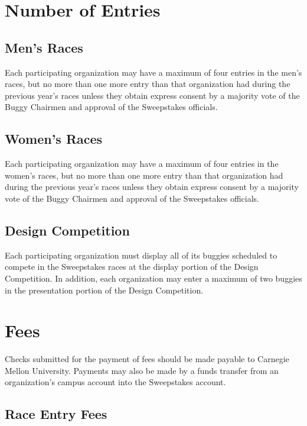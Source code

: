 \documentclass[openany]{book}
\begin{document}
\section{Number of Entries}

\subsection{Men's Races}

Each participating organization may have a maximum of four entries in the men's races, but no more than one more entry than that organization had during the previous year's races unless they obtain express consent by a majority vote of the Buggy Chairmen and approval of the Sweepstakes officials.

\subsection{Women's Races}

Each participating organization may have a maximum of four entries in the women's races, but no more than one more entry than that organization had during the previous year's races unless they obtain express consent by a majority vote of the Buggy Chairmen and approval of the Sweepstakes officials.

\subsection{Design Competition}

Each participating organization must display all of its buggies scheduled to compete in the Sweepstakes races at the display portion of the Design Competition. In addition, each organization may enter a maximum of two buggies in the presentation portion of the Design Competition.

\section{Fees}

Checks submitted for the payment of fees should be made payable to Carnegie Mellon University. Payments may also be made by a funds transfer from an organization's campus account into the Sweepstakes account.

\subsection{Race Entry Fees}
\end{document}
